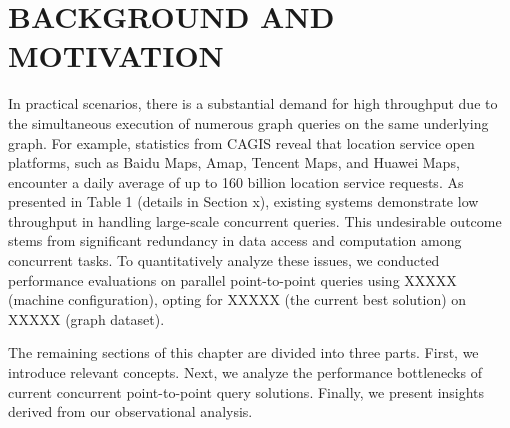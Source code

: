 \documentclass[lettersize,journal]{IEEEtran} %
\begin{document}
\section{BACKGROUND AND MOTIVATION}
In practical scenarios, there is a substantial demand for high throughput due to the simultaneous execution of numerous graph queries on the same underlying graph. For example, statistics from CAGIS\cite{cagis} reveal that location service open platforms, such as Baidu Maps\cite{baidu}, Amap\cite{amap}, Tencent Maps\cite{qq}, and Huawei Maps\cite{petalmaps}, encounter a daily average of up to 160 billion location service requests. As presented in Table 1 (details in Section x), existing systems demonstrate low throughput in handling large-scale concurrent queries. This undesirable outcome stems from significant redundancy in data access and computation among concurrent tasks. To quantitatively analyze these issues, we conducted performance evaluations on parallel point-to-point queries using XXXXX (machine configuration), opting for XXXXX (the current best solution) on XXXXX (graph dataset).

The remaining sections of this chapter are divided into three parts. First, we introduce relevant concepts. Next, we analyze the performance bottlenecks of current concurrent point-to-point query solutions. Finally, we present insights derived from our observational analysis.
\end{document}
